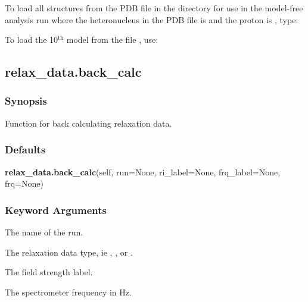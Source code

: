 To load all structures from the PDB file 
 in the directory 
 for use in the
model-free analysis run 
 where the heteronucleus in the PDB file is 
 and the proton
is 
, type:





To load the 10$^\mathrm{th}$ model from the file 
, use:





\newpage

\subsection{relax\_data.back\_calc}


\subsubsection{Synopsis}

Function for back calculating relaxation data.

\subsubsection{Defaults}

\textsf{\textbf{relax\_data.back\_calc}(self, run=None, ri\_label=None, frq\_label=None, frq=None)}


\subsubsection{Keyword Arguments}


  The name of the run.

  The relaxation data type, ie 
, 
, or 
.

  The field strength label.

  The spectrometer frequency in Hz.


\newpage

